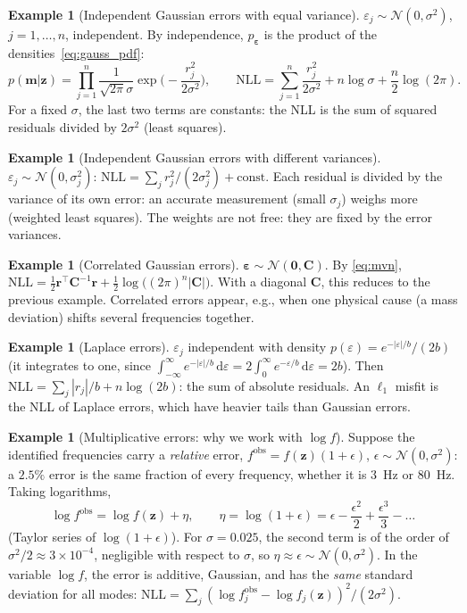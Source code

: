 \documentclass[11pt,a4paper]{article}
\numberwithin{equation}{section}
\theoremstyle{plain}
\theoremstyle{definition}
\newtheorem{example}[proposition]{Example}
\theoremstyle{remark}
\newcommand{\m}{\mathbf{m}}
\newcommand{\z}{\mathbf{z}}
\newcommand{\rr}{\mathbf{r}}
\newcommand{\eps}{\bm{\varepsilon}}
\newcommand{\Cb}{\mathbf{C}}
\newcommand{\NLL}{\mathrm{NLL}}
\newcommand{\N}{\mathcal{N}}
\newcommand{\dd}{\,\mathrm{d}}
\begin{document}
\begin{example}[Independent Gaussian errors with equal variance]
$\varepsilon_j\sim\N(0,\sigma^2)$, $j=1,\dots,n$, independent. By independence, $p_{\eps}$ is the product of the densities~\eqref{eq:gauss_pdf}:
\begin{equation*}
p(\m|\z)=\prod_{j=1}^n\frac{1}{\sqrt{2\pi}\sigma}\exp\Big(-\frac{r_j^2}{2\sigma^2}\Big),\qquad
\NLL=\sum_{j=1}^n\frac{r_j^2}{2\sigma^2}+n\log\sigma+\frac n2\log(2\pi).
\end{equation*}
For a fixed $\sigma$, the last two terms are constants: the NLL is the sum of squared residuals divided by $2\sigma^2$ (least squares).
\end{example}

\begin{example}[Independent Gaussian errors with different variances]
$\varepsilon_j\sim\N(0,\sigma_j^2)$: $\NLL=\sum_jr_j^2/(2\sigma_j^2)+\text{const}$. Each residual is divided by the variance of its own error: an accurate measurement (small $\sigma_j$) weighs more (weighted least squares). The weights are not free: they are fixed by the error variances.
\end{example}

\begin{example}[Correlated Gaussian errors]
\label{ex:corr_gauss}
$\eps\sim\N(\mathbf0,\Cb)$. By \eqref{eq:mvn}, $\NLL=\tfrac12\rr^\top\Cb^{-1}\rr+\tfrac12\log\big((2\pi)^n|\Cb|\big)$. With a diagonal $\Cb$, this reduces to the previous example. Correlated errors appear, e.g., when one physical cause (a mass deviation) shifts several frequencies together.
\end{example}

\begin{example}[Laplace errors]
$\varepsilon_j$ independent with density $p(\varepsilon)=e^{-|\varepsilon|/b}/(2b)$ (it integrates to one, since $\int_{-\infty}^\infty e^{-|\varepsilon|/b}\dd\varepsilon=2\int_0^\infty e^{-\varepsilon/b}\dd\varepsilon=2b$). Then $\NLL=\sum_j|r_j|/b+n\log(2b)$: the sum of absolute residuals. An $\ell_1$ misfit is the NLL of Laplace errors, which have heavier tails than Gaussian errors.
\end{example}

\begin{example}[Multiplicative errors: why we work with $\log f$]
\label{ex:multiplicative}
Suppose the identified frequencies carry a \emph{relative} error, $f^{\text{obs}}=f(\z)(1+\epsilon)$, $\epsilon\sim\N(0,\sigma^2)$: a $2.5\%$ error is the same fraction of every frequency, whether it is 3~Hz or 80~Hz. Taking logarithms,
\begin{equation*}
\log f^{\text{obs}}=\log f(\z)+\eta,\qquad \eta=\log(1+\epsilon)=\epsilon-\frac{\epsilon^2}{2}+\frac{\epsilon^3}3-\dots
\end{equation*}
(Taylor series of $\log(1+\epsilon)$). For $\sigma=0.025$, the second term is of the order of $\sigma^2/2\approx3\times10^{-4}$, negligible with respect to $\sigma$, so $\eta\approx\epsilon\sim\N(0,\sigma^2)$. In the variable $\log f$, the error is additive, Gaussian, and has the \emph{same} standard deviation for all modes: $\NLL=\sum_j(\log f^{\text{obs}}_j-\log f_j(\z))^2/(2\sigma^2)$.
\end{example}
\end{document}

